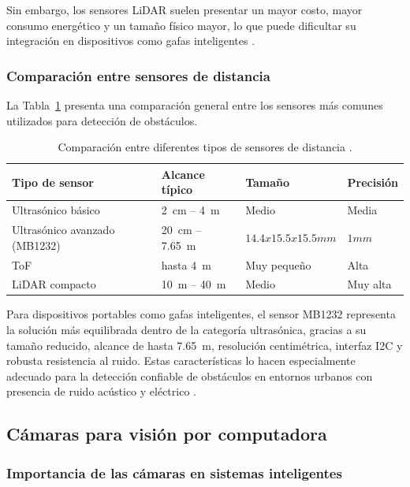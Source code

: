 Sin embargo, los sensores LiDAR suelen presentar un mayor costo, mayor consumo energético y un tamaño físico mayor, lo que puede dificultar su integración en dispositivos como gafas inteligentes \cite{tfmini_datasheet, lidarliitev3_manual}.

\subsubsection{Comparación entre sensores de distancia}

La Tabla~\ref{tabla_sensores} presenta una comparación general entre los sensores más comunes utilizados para detección de obstáculos.

\begin{table}[H]
\centering
\begin{tabular}{llll}
\hline
Tipo de sensor & Alcance típico & Tamaño & Precisión \\
\hline
Ultrasónico básico & 2~cm -- 4~m   & Medio       & Media \\
Ultrasónico avanzado (MB1232) & 20~cm -- 7.65~m & $14.4x15.5x15.5mm$ & $1mm$ \\
ToF            & hasta 4~m    & Muy pequeño & Alta \\
LiDAR compacto & 10~m -- 40~m & Medio       & Muy alta \\
\hline
\end{tabular}
\caption{Comparación entre diferentes tipos de sensores de distancia \cite{hcsr04_datasheet, mb1232_datasheet, vl53l1x_datasheet, lidarliitev3_manual}.}
\label{tabla_sensores}
\end{table}

Para dispositivos portables como gafas inteligentes, el sensor MB1232 representa la solución más equilibrada dentro de la categoría ultrasónica, gracias a su tamaño reducido, alcance de hasta 7.65~m, resolución centimétrica, interfaz I2C y robusta resistencia al ruido. Estas características lo hacen especialmente adecuado para la detección confiable de obstáculos en entornos urbanos con presencia de ruido acústico y eléctrico \cite{mb1232_datasheet}.

\subsection{Cámaras para visión por computadora}

\subsubsection{Importancia de las cámaras en sistemas inteligentes}

